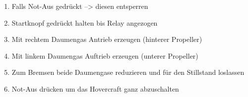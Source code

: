 \begin{enumerate}
    \item Falls Not-Aus gedrückt --> diesen entsperren
    \item Startknopf gedrückt halten bis Relay angezogen
    \item Mit rechtem Daumengas Antrieb erzeugen (hinterer Propeller)
    \item Mit linkem Daumengas Auftrieb erzeugen (unterer Propeller)
    \item Zum Bremsen beide Daumengase reduzieren und für den Stillstand loslassen
    \item Not-Aus drücken um das Hovercraft ganz abzuschalten
\end{enumerate}